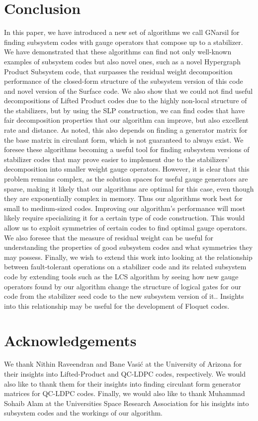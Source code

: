 \documentclass[conference]{IEEEtran}
\begin{document}
\section{Conclusion}
In this paper, we have introduced a new set of algorithms we call GNarsil for finding subsystem codes with gauge operators that compose up to a stabilizer. We have demonstrated that these algorithms can find not only well-known examples of subsystem codes but also novel ones, such as a novel Hypergraph Product Subsystem code, that surpasses the residual weight decomposition performance of the closed-form structure of the subsystem version of this code and novel version of the Surface code. We also show that we could not find useful decompositions of Lifted Product codes due to the highly non-local structure of the stabilizers, but by using the SLP construction, we can find codes that have fair decomposition properties that our algorithm can improve, but also excellent rate and distance. As noted, this also depends on finding a generator matrix for the base matrix in circulant form, which is not guaranteed to always exist.  We foresee these algorithms becoming a useful tool for finding subsystem versions of stabilizer codes that may prove easier to implement due to the stabilizers' decomposition into smaller weight gauge operators. However, it is clear that this problem remains complex, as the solution spaces for useful gauge generators are sparse, making it likely that our algorithms are optimal for this case, even though they are exponentially complex in memory. Thus our algorithms work best for small to medium-sized codes. Improving our algorithm's performance will most likely require specializing it for a certain type of code construction. This would allow us to exploit symmetries of certain codes to find optimal gauge operators. We also foresee that the measure of residual weight can be useful for understanding the properties of good subsystem codes and what symmetries they may possess. Finally, we wish to extend this work into looking at the relationship between fault-tolerant operations on a stabilizer code and its related subsystem code by extending tools such as the LCS algorithm 
 by seeing how new gauge operators found by our algorithm change the structure of logical gates for our code from the stabilizer seed code to the new subsystem version of it.\cite{rengaswamy2018synthesis}. Insights into this relationship may be useful for the development of Floquet codes. \\
 \section*{Acknowledgements}
 We thank Nithin Raveendran and Bane Vasić at the University of Arizona for their insights into Lifted-Product and QC-LDPC codes, respectively. We would also like to thank them for their insights into finding circulant form generator matrices for QC-LDPC codes. Finally, we would also like to thank Muhammad Sohaib Alam at the Universities Space Research Association for his insights into subsystem codes and the workings of our algorithm. 
\end{document}
